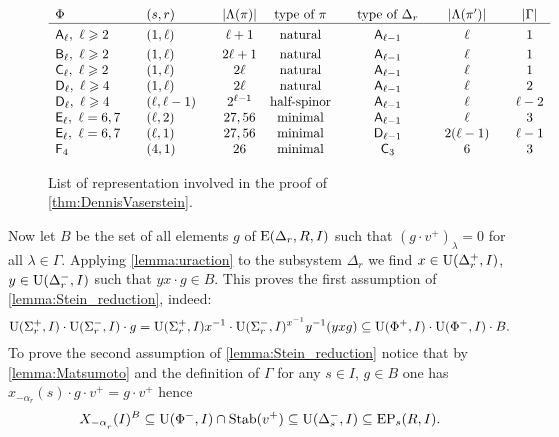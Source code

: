\begin{figure}
\[\begin{array}{l @{\qquad} l @{\qquad} c @{\quad} c @{\qquad} c @{\qquad} c @{\qquad} c}
\Phi                                 & (s,r)         & |\Lambda(\pi)| & \text{type of $\pi$} & \text{type of $\Delta_r$} & |\Lambda(\pi')|& |\Gamma|  \\ \hline\vphantom{\Bigl(}
\rA_\ell,\ \ell\geqslant 2           & (1,\ell)      & \ell+1         & \text{natural}       & \rA_{\ell-1}              & \ell           & 1  \\     
\rB_\ell,\ \ell\geqslant 2           & (1,\ell)      & 2\ell+1        & \text{natural}       & \rA_{\ell-1}              & \ell           & 1  \\     
\rC_\ell,\ \ell\geqslant 2           & (1,\ell)      & 2\ell          & \text{natural}       & \rA_{\ell-1}              & \ell           & 1  \\
\rD_\ell,\ \ell\geqslant 4           & (1,\ell)      & 2\ell          & \text{natural}       & \rA_{\ell-1}              & \ell           & 2  \\ 
\rD_\ell,\ \ell\geqslant 4           & (\ell,\ell-1) & 2^{\ell-1}     & \text{half-spinor}   & \rA_{\ell-1}              & \ell           & \ell-2  \\
\rE_\ell,\ \ell=6,7                  & (\ell,2)      & 27, 56         & \text{minimal}       & \rA_{\ell-1}              & \ell           & 3       \\ 
\rE_\ell,\ \ell=6,7                  & (\ell,1)      & 27, 56         & \text{minimal}       & \rD_{\ell-1}              & 2(\ell-1)      & \ell-1  \\
\rF_4                                & (4, 1)        & 26             & \text{minimal}       & \rC_3                     & 6              & 3\end{array}\]
 \caption[Table]{List of representation involved in the proof of \cref{thm:DennisVaserstein}.} \label{fig:table}
\end{figure}

Now let $B$ be the set of all elements $g$ of $\operatorname{E}(\Delta_r,R, I)$ such that $(g \cdot v^+)_\lambda = 0$ for all $\lambda\in\Gamma$.
Applying \cref{lemma:uraction} to the subsystem $\Delta_r$ we find
$x\in\operatorname{U}(\Delta_r^+, I)$, $y\in \operatorname{U}(\Delta_r^-, I)$ such that $yx\cdot g \in B$.
This proves the first assumption of \cref{lemma:Stein_reduction}, indeed:
\[ \operatorname{U}(\Sigma^+_r, I) \cdot \operatorname{U}(\Sigma^-_r, I) \cdot g = \operatorname{U}(\Sigma^+_r, I) x^{-1} \cdot \operatorname{U}(\Sigma^-_r, I)^{x^{-1}} y^{-1} (yxg) \subseteq \operatorname{U}(\Phi^+, I) \cdot \operatorname{U}(\Phi^-, I) \cdot B. \]
To prove the second assumption of \cref{lemma:Stein_reduction} notice that by \cref{lemma:Matsumoto} and the definition of $\Gamma$ for any $s\in I$, $ g\in B$ one has $x_{-\alpha_r}(s) \cdot g \cdot v^+ = g \cdot v^+$ hence
\[ X_{-\alpha\ssub{r}}(I)^{B} \subseteq \U(\Phi^-, I) \cap \Stab(v^+) \subseteq \U(\Delta_s^-, I) \subseteq \EP_s(R, I). \]

